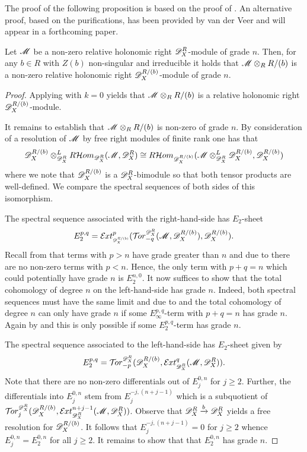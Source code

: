  The proof of the following proposition is based on the proof of \cite[Proposition 3.4.3]{budur2020zeroI}.
 An alternative proof, based on the purifications, has been provided by van der Veer and will appear in a forthcoming paper.
 \begin{proposition}\label{prop: RestrictConservesGraden}
   Let $\mathscr{M}$ be a non-zero relative holonomic right $\mathscr{D}_X^R$-module of grade $n$.
   Then, for any $b\in R$ with $Z(b)$ non-singular and irreducible it holds that $\mathscr{M}\otimes_R R/(b)$ is a non-zero relative holonomic right $\mathscr{D}_X^{R/(b)}$-module of grade $n$.
 \end{proposition}\begin{proof}
   Applying  with $k=0$ yields that $\mathscr{M} \otimes_R R/(b)$ is a relative holonomic right $\mathscr{D}_X^{R/(b)}$-module.

  It remains to establish that $\mathscr{M} \otimes_R R/(b)$ is non-zero of grade $n$.
  By consideration of a resolution of $\mathscr{M}$ by free right modules of finite rank one has that
  $$ \mathscr{D}_X^{R/(b)} \otimes_{\mathscr{D}_X^R}^LR\mathcal{H}om_{\mathscr{D}_X^R}(\mathscr{M},\mathscr{D}_X^R) \cong R \mathcal{H}om_{\mathscr{D}_X^{R/(b)} }(\mathscr{M}\otimes_{\mathscr{D}_X^R }^L \mathscr{D}_X^{R/(b)}, \mathscr{D}_X^{R/(b)}) $$
  where we note that $\mathscr{D}_X^{R/(b)}$ is a $\mathscr{D}_X^{R}$-bimodule so that both tensor products are well-defined.
  We compare the spectral sequences of both sides of this isomorphism.

  The spectral sequence associated with the right-hand-side has $E_2$-sheet
  $$E^{p,q}_2 = \Ex{\D_X^{R/(b)}}{p}(\Tr{\D_X^R}{-q}(\M, \D_X^{R/(b)}), \D_X^{R/(b)}).$$
  Recall from  that terms with $p>n$ have grade greater than $n$ and due to  there are no non-zero terms with $p<n$.
  Hence, the only term with $p+q = n$ which could potentially have grade $n$ is $E^{n,0}_2$.
  It now suffices to show that the total cohomology of degree $n$ on the left-hand-side has grade $n$.
  Indeed, both spectral sequences must have the same limit and due to  and  the total cohomology of degree $n$ can only have grade $n$ if some $E^{p,q}_\infty$-term with $p+q=n$ has grade $n$.
  Again by  and  this is only possible if some $E^{p,q}_2$-term has grade $n$.

  The spectral sequence associated to the left-hand-side has $E_2$-sheet given by
  $$E_2^{p,q} =\Tr{\D_X^R}{-p}(\D_X^{R/(b)}, \Ex{\D_X^R}{q}(\M,\D_X^R)).$$
  Note that there are no non-zero differentials out of $E_j^{0,n}$ for $j\geq 2$.
  Further, the differentials into $E^{0,n}_j$ stem from $E^{-j,(n+j-1)}_j$ which is a subquotient of $\Tr{\D_X^R}{j}( \D_X^{R/(b)} ,\Ex{\D_X^R}{n+j-1}(\M, \D_X^R))$.
  Observe that $\mathscr{D}_X^R \xrightarrow{b} \mathscr{D}_X^R $ yields a free resolution for $\mathscr{D}_X^{R/(b)}$.
  It follows that $E^{-j,(n+j-1)}_j=0$ for $j\geq 2$ whence $E_j^{0,n} = E_2^{0,n}$ for all $j\geq 2$.
  It remains to show that that $E_2^{0,n}$ has grade $n$.


\end{proof}
